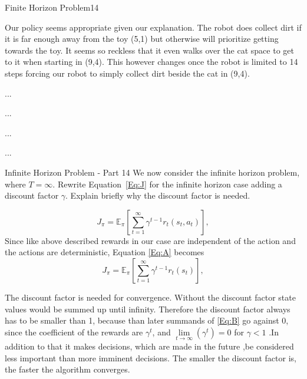 \begin{questions}
\begin{question}{Finite Horizon Problem}{14}
\begin{answer}
	Our policy seems appropriate given our explanation. The robot does collect dirt if it is far enough away from the toy (5,1) but otherwise will prioritize getting towards the toy. It seems so reckless that it even walks over the cat space to get to it when starting in (9,4). This however changes once the robot is limited to 14 steps forcing our robot to simply collect dirt beside the cat in (9,4). 
	
	...
	
	...
	
	...
	
	...
\end{answer}

\end{question}



\begin{question}{Infinite Horizon Problem - Part 1}{4}
We now consider the infinite horizon problem, where $T=\infty$. Rewrite Equation~\eqref{Eq:J} for the infinite horizon case adding a discount factor $\gamma$. Explain briefly why the discount factor is needed.

\begin{answer}
\begin{equation}
	J_\pi = \mathbb{E}_\pi\left[\sum_{t=1}^{\infty} \gamma^{t-1} r_t(s_t,a_t)\right],
	\label{Eq:A}
\end{equation}
Since like above described rewards in our case are independent of
the action and the actions are deterministic, Equation \eqref{Eq:A} becomes
\begin{equation}
	J_\pi = \mathbb{E}_\pi\left[\sum_{t=1}^{\infty} \gamma^{t-1} r_t(s_t)\right],
	\label{Eq:B}
\end{equation}

The discount factor is needed for convergence. Without the discount factor state values would be summed up until infinity. Therefore the discount factor always has to be smaller than 1, because than later summands of \eqref{Eq:B} go against 0, since the coefficient of the rewards are $\gamma^t$, and $\lim\limits_{t\rightarrow\infty}(\gamma^t) = 0$ for $\gamma < 1$ .In addition to that it makes decisions, which are made in the future ,be considered less important than more imminent decisions. The smaller the discount factor is, the faster the algorithm converges.


\end{answer}
\end{question}
\end{questions}
